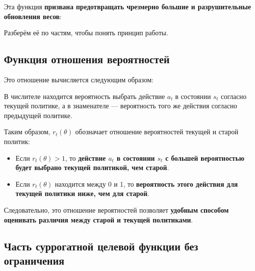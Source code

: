 \documentclass[11pt,a4paper]{article}
\begin{document}
Эта функция \textbf{призвана предотвращать чрезмерно большие и разрушительные обновления весов}:


Разберём её по частям, чтобы понять принцип работы.

\subsection{Функция отношения вероятностей}\label{the-ratio-function}


Это отношение вычисляется следующим образом:


В числителе находится вероятность выбрать действие \(a_t\) в состоянии \(s_t\) согласно текущей политике, а в знаменателе --- вероятность того же действия согласно предыдущей политике.

Таким образом, \(r_t(\theta)\) обозначает отношение вероятностей текущей и старой политик:

\begin{itemize}
\tightlist
\item
  Если \(r_t(\theta) > 1\), то \textbf{действие \(a_t\) в состоянии \(s_t\) с большей вероятностью будет выбрано текущей политикой, чем старой}.
\item
  Если \(r_t(\theta)\) находится между 0 и 1, то \textbf{вероятность этого действия для текущей политики ниже, чем для старой}.
\end{itemize}

Следовательно, это отношение вероятностей позволяет \textbf{удобным способом оценивать различия между старой и текущей политиками}.

\subsection{Часть суррогатной целевой функции без ограничения}\label{the-unclipped-part-of-the-clipped-surrogate-objective-function}
\end{document}

